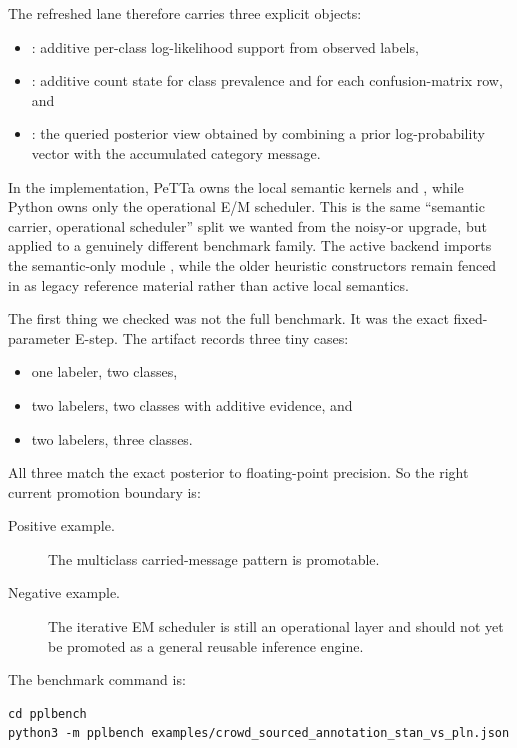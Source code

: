 \documentclass[11pt,openany]{report}
\begin{document}
The refreshed lane therefore carries three explicit objects:
\begin{itemize}
\item {}: additive per-class log-likelihood support
from observed labels,
\item {}: additive count state for class prevalence and
for each confusion-matrix row, and
\item {}: the queried posterior view obtained by
combining a prior log-probability vector with the accumulated category
message.
\end{itemize}
In the implementation, PeTTa owns the local semantic kernels
 and , while Python
owns only the operational E/M scheduler.  This is the same
``semantic carrier, operational scheduler'' split we wanted from the noisy-or
upgrade, but applied to a genuinely different benchmark family.  The active
backend imports the semantic-only module
,
while the older heuristic constructors remain fenced in
 as legacy
reference material rather than active local semantics.

The first thing we checked was not the full benchmark.  It was the exact
fixed-parameter E-step.  The artifact
 records
three tiny cases:
\begin{itemize}
\item one labeler, two classes,
\item two labelers, two classes with additive evidence, and
\item two labelers, three classes.
\end{itemize}
All three match the exact posterior to floating-point precision.  So the
right current promotion boundary is:
\begin{description}
\item[Positive example.] The multiclass carried-message pattern is promotable.
\item[Negative example.] The iterative EM scheduler is still an operational
layer and should not yet be promoted as a general reusable inference engine.
\end{description}

The benchmark command is:
\begin{lstlisting}
cd pplbench
python3 -m pplbench examples/crowd_sourced_annotation_stan_vs_pln.json
\end{lstlisting}
\end{document}
